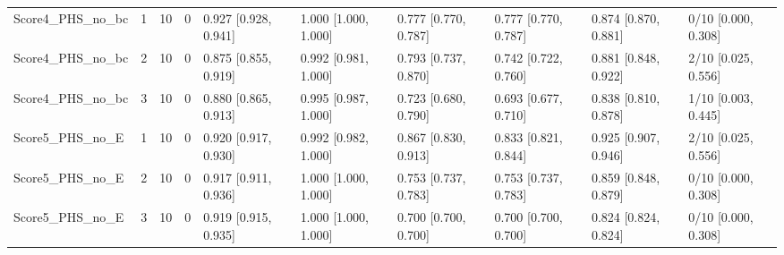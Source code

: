 \begin{table}
\begin{tabular}{llllllllll}
Score4\_PHS\_no\_bc & 1 & 10 & 0 & 0.927 [0.928, 0.941] & 1.000 [1.000, 1.000] & 0.777 [0.770, 0.787] & 0.777 [0.770, 0.787] & 0.874 [0.870, 0.881] & 0/10 [0.000, 0.308] \\
Score4\_PHS\_no\_bc & 2 & 10 & 0 & 0.875 [0.855, 0.919] & 0.992 [0.981, 1.000] & 0.793 [0.737, 0.870] & 0.742 [0.722, 0.760] & 0.881 [0.848, 0.922] & 2/10 [0.025, 0.556] \\
Score4\_PHS\_no\_bc & 3 & 10 & 0 & 0.880 [0.865, 0.913] & 0.995 [0.987, 1.000] & 0.723 [0.680, 0.790] & 0.693 [0.677, 0.710] & 0.838 [0.810, 0.878] & 1/10 [0.003, 0.445] \\
Score5\_PHS\_no\_E & 1 & 10 & 0 & 0.920 [0.917, 0.930] & 0.992 [0.982, 1.000] & 0.867 [0.830, 0.913] & 0.833 [0.821, 0.844] & 0.925 [0.907, 0.946] & 2/10 [0.025, 0.556] \\
Score5\_PHS\_no\_E & 2 & 10 & 0 & 0.917 [0.911, 0.936] & 1.000 [1.000, 1.000] & 0.753 [0.737, 0.783] & 0.753 [0.737, 0.783] & 0.859 [0.848, 0.879] & 0/10 [0.000, 0.308] \\
Score5\_PHS\_no\_E & 3 & 10 & 0 & 0.919 [0.915, 0.935] & 1.000 [1.000, 1.000] & 0.700 [0.700, 0.700] & 0.700 [0.700, 0.700] & 0.824 [0.824, 0.824] & 0/10 [0.000, 0.308] \\
\bottomrule
\end{tabular}
\end{table}

